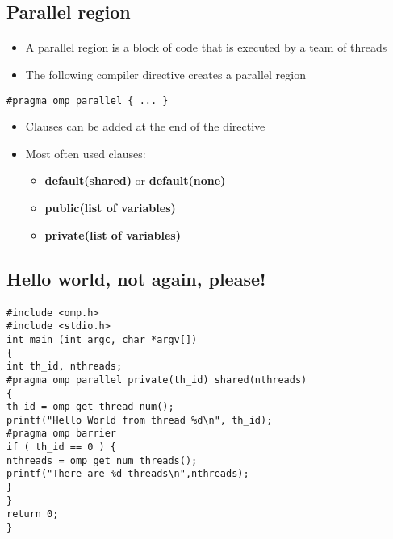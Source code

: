 \documentclass[%
oneside,                 %
final,                   %
10pt]{article}
\begin{document}
\subsection*{Parallel region}

\paragraph{}
\begin{itemize}
\item A parallel region is a block of code that is executed by a team of threads

\item The following compiler directive creates a parallel region
\end{itemize}

\noindent
\begin{verbatim}
#pragma omp parallel { ... }
\end{verbatim}
\begin{itemize}
\item Clauses can be added at the end of the directive

\item Most often used clauses:
\begin{itemize}

 \item \textbf{default(shared)} or \textbf{default(none)}

 \item \textbf{public(list of variables)}

 \item \textbf{private(list of variables)}
\end{itemize}

\noindent
\end{itemize}

\noindent



\subsection*{Hello world, not again, please!}

\paragraph{}
\begin{verbatim}
#include <omp.h>
#include <stdio.h>
int main (int argc, char *argv[])
{
int th_id, nthreads;
#pragma omp parallel private(th_id) shared(nthreads)
{
th_id = omp_get_thread_num();
printf("Hello World from thread %d\n", th_id);
#pragma omp barrier
if ( th_id == 0 ) {
nthreads = omp_get_num_threads();
printf("There are %d threads\n",nthreads);
}
}
return 0;
}
\end{verbatim}
\end{document}
